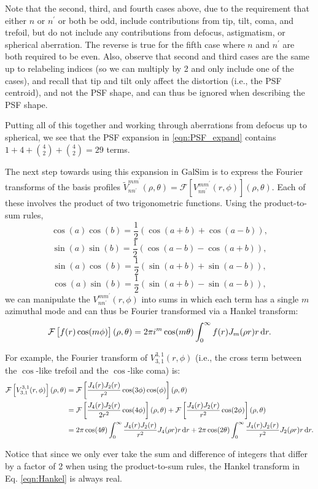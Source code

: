 \documentclass{article}
\begin{document}
Note that the second, third, and fourth cases above, due to the requirement that either $n$ or $n^\prime$ or both be odd, include contributions from tip, tilt, coma, and trefoil, but do not include any contributions from defocus, astigmatism, or spherical aberration.
The reverse is true for the fifth case where $n$ and $n^\prime$ are both required to be even.
Also, observe that second and third cases are the same up to relabeling indices (so we can multiply by 2 and only include one of the cases), and recall that tip and tilt only affect the distortion (i.e., the PSF centroid), and not the PSF shape, and can thus be ignored when describing the PSF shape.

Putting all of this together and working through aberrations from defocus up to spherical, we see that the PSF expansion in \ref{eqn:PSF_expand} contains $1 + 4 + \binom{4}{2} + \binom{4}{2} = 29$ terms.

The next step towards using this expansion in GalSim is to express the Fourier transforms of the basis profiles $\widetilde{V}_{n n^\prime}^{m m^\prime}(\rho, \theta) = \mathcal{F} \left[V_{n n^\prime}^{m m^\prime}(r, \phi)\right] (\rho, \theta)$.
Each of these involves the product of two trigonometric functions.
Using the product-to-sum rules,
\begin{equation}
  \cos(a) \cos(b) = \frac{1}{2}\left(\cos(a+b) + \cos(a-b)\right),
\end{equation}
\begin{equation}
  \sin(a) \sin(b) = \frac{1}{2}\left(\cos(a-b) - \cos(a+b)\right),
\end{equation}
\begin{equation}
  \sin(a) \cos(b) = \frac{1}{2}\left(\sin(a+b) + \sin(a-b)\right),
\end{equation}
\begin{equation}
  \cos(a) \sin(b) = \frac{1}{2}\left(\sin(a+b) - \sin(a-b)\right),
\end{equation}
we can manipulate the $V_{n n^\prime}^{m m^\prime}(r, \phi)$ into sums in which each term has a single $m$ azimuthal mode and can thus be Fourier transformed via a Hankel transform:
\begin{equation}
  \label{eqn:Hankel}
  \mathcal{F} \left[f(r) \cos(m \phi) \right](\rho, \theta) = 2 \pi i^m \cos(m \theta) \int_0^\infty f(r) J_m(\rho r) r \dif{r}.
\end{equation}

For example, the Fourier transform of $V_{3,1}^{3,1}(r, \phi)$ (i.e., the cross term between the $\cos$-like trefoil and the $\cos$-like coma) is:
\begin{align}
  \mathcal{F} \left[V_{3,1}^{3,1}(r, \phi)\right](\rho, \theta) &= \mathcal{F} \left[\frac{J_4(r) J_2(r)}{r^2} \cos(3 \phi) \cos(\phi)\right](\rho, \theta) \\
  &= \mathcal{F} \left[\frac{J_4(r) J_2(r)}{2 r^2} \cos(4 \phi)\right](\rho, \theta) + \mathcal{F} \left[\frac{J_4(r) J_2(r)}{r^2} \cos(2 \phi)\right](\rho, \theta) \\
  &= 2 \pi \cos(4 \theta) \int_0^\infty \frac{J_4(r) J_2(r)}{r^2} J_4(\rho r) r \dif{r} + 2 \pi \cos(2 \theta) \int_0^\infty \frac{J_4(r) J_2(r)}{r^2} J_2(\rho r) r \dif{r}.
\end{align}

Notice that since we only ever take the sum and difference of integers that differ by a factor of 2 when using the product-to-sum rules, the Hankel transform in Eq. \ref{eqn:Hankel} is always real.
\end{document}

